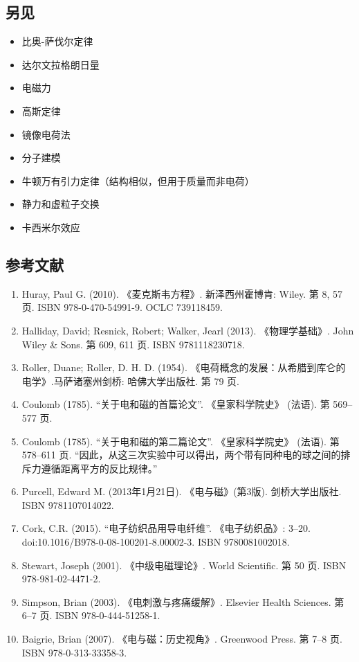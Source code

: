 \subsection{另见}
\begin{itemize}
\item 比奥-萨伐尔定律
\item 达尔文拉格朗日量
\item 电磁力
\item 高斯定律
\item 镜像电荷法
\item 分子建模
\item 牛顿万有引力定律（结构相似，但用于质量而非电荷）
\item 静力和虚粒子交换
\item 卡西米尔效应
\end{itemize}
\subsection{参考文献}
\begin{enumerate}
\item Huray, Paul G. (2010). 《麦克斯韦方程》. 新泽西州霍博肯: Wiley. 第 8, 57 页. ISBN 978-0-470-54991-9. OCLC 739118459.
\item Halliday, David; Resnick, Robert; Walker, Jearl (2013). 《物理学基础》. John Wiley & Sons. 第 609, 611 页. ISBN 9781118230718.
\item Roller, Duane; Roller, D. H. D. (1954). 《电荷概念的发展：从希腊到库仑的电学》.马萨诸塞州剑桥: 哈佛大学出版社. 第 79 页.
\item Coulomb (1785). “关于电和磁的首篇论文”. 《皇家科学院史》 (法语). 第 569–577 页.
\item Coulomb (1785). “关于电和磁的第二篇论文”. 《皇家科学院史》 (法语). 第 578–611 页. “因此，从这三次实验中可以得出，两个带有同种电的球之间的排斥力遵循距离平方的反比规律。”
\item Purcell, Edward M. (2013年1月21日). 《电与磁》(第3版). 剑桥大学出版社. ISBN 9781107014022.
\item Cork, C.R. (2015). “电子纺织品用导电纤维”. 《电子纺织品》: 3–20. doi:10.1016/B978-0-08-100201-8.00002-3. ISBN 9780081002018.
\item Stewart, Joseph (2001). 《中级电磁理论》. World Scientific. 第 50 页. ISBN 978-981-02-4471-2.
\item Simpson, Brian (2003). 《电刺激与疼痛缓解》. Elsevier Health Sciences. 第 6–7 页. ISBN 978-0-444-51258-1.
\item Baigrie, Brian (2007). 《电与磁：历史视角》. Greenwood Press. 第 7–8 页. ISBN 978-0-313-33358-3.
\end{enumerate}